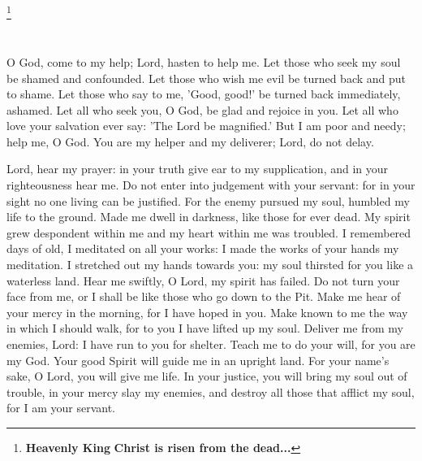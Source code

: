 \deletechar\throughtheprayers

\heavenlyking
\footnote{ \textbf{Heavenly King} \textbf{Christ is risen from the dead...} }


\trisagion\\

\comeletusworship


\psalmfifty


O God, come to my help; Lord, hasten to help me. Let those who seek my soul be shamed and confounded.
Let those who wish me evil be turned back and put to shame.
Let those who say to me, 'Good, good!' be turned back immediately, ashamed.
Let all who seek you, O God, be glad and rejoice in you.
Let all who love your salvation ever say: 'The Lord be magnified.'
But I am poor and needy; help me, O God. You are my helper and my deliverer; Lord, do not delay.


Lord, hear my prayer: in your truth give ear to my supplication, and in your righteousness hear me.
Do not enter into judgement with your servant: for in your sight no one living can be justified.
For the enemy pursued my soul, humbled my life to the ground.
Made me dwell in darkness, like those for ever dead.
My spirit grew despondent within me and my heart within me was troubled.
I remembered days of old, I meditated on all your works: I made the works of your hands my meditation.
I stretched out my hands towards you: my soul thirsted for you like a waterless land.
Hear me swiftly, O Lord, my spirit has failed.
Do not turn your face from me, or I shall be like those who go down to the Pit.
Make me hear of your mercy in the morning, for I have hoped in you.
Make known to me the way in which I should walk, for to you I have lifted up my soul.
Deliver me from my enemies, Lord: I have run to you for shelter.
Teach me to do your will, for you are my God.
Your good Spirit will guide me in an upright land.
For your name's sake, O Lord, you will give me life.
In your justice, you will bring my soul out of trouble, in your mercy slay my enemies,
and destroy all those that afflict my soul, for I am your servant.


